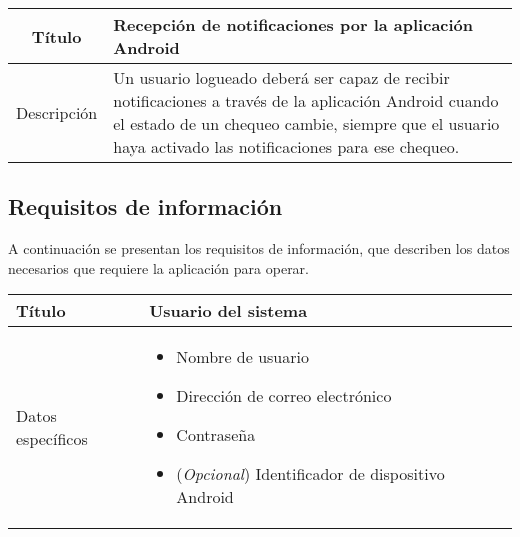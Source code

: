 \begin{center}
  
  \begin{tabularx}{\textwidth}{|c|X|}
    \hline
    Título & Recepción de notificaciones por la aplicación Android \\

    \hline

    Descripción & Un usuario logueado deberá ser capaz de recibir notificaciones
    a través de la aplicación Android cuando el estado de un chequeo cambie,
    siempre que el usuario haya activado las notificaciones para ese
    chequeo. \\

    \hline
  \end{tabularx}
\end{center}

\FloatBarrier
\subsection{Requisitos de información}
\label{sec:requisitos-informacion}

A continuación se presentan los requisitos de información, que describen los
datos necesarios que requiere la aplicación para operar.

\begin{center}
  
  \begin{tabularx}{\textwidth}{|l|X|}
    \hline

    Título & Usuario del sistema\\

    \hline
    Datos específicos &

    \begin{itemize}
    \item Nombre de usuario
    \item Dirección de correo electrónico
    \item Contraseña
    \item (\textit{Opcional}) Identificador de dispositivo Android
    \end{itemize}
    \\
    
    \hline
    
  \end{tabularx}
\end{center}


